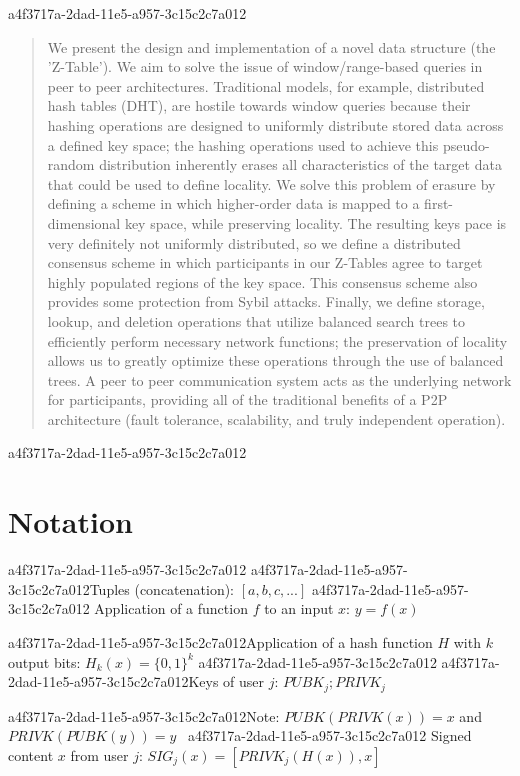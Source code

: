 \documentclass[12pt]{article}
\begin{document}
a4f3717a-2dad-11e5-a957-3c15c2c7a012
\maketitle

\begin{abstract}
We present the design and implementation of a novel data structure (the 'Z-Table'). We aim to solve the issue of window/range-based queries in peer to peer architectures. Traditional models, for example,  distributed hash tables (DHT), are hostile towards window queries because their hashing operations are designed to uniformly distribute stored data across a defined key space; the hashing operations used to achieve this pseudo-random distribution inherently erases all characteristics of the target data that could be used to define locality. We solve this problem of erasure by defining a scheme in which higher-order data is mapped to a first-dimensional key space, while preserving locality. The resulting keys pace is very definitely not uniformly distributed, so we define a distributed consensus scheme in which participants in our Z-Tables agree to target highly populated regions of the key space. This consensus scheme also provides some protection from Sybil attacks. Finally, we define storage, lookup, and deletion operations that utilize balanced search trees to efficiently perform necessary network functions; the preservation of locality allows us to greatly optimize these operations through the use of balanced trees. A peer to peer communication system acts as the underlying network for participants, providing all of the traditional benefits of a P2P architecture (fault tolerance, scalability, and truly independent operation).
\end{abstract}

a4f3717a-2dad-11e5-a957-3c15c2c7a012\section{Notation}
a4f3717a-2dad-11e5-a957-3c15c2c7a012
a4f3717a-2dad-11e5-a957-3c15c2c7a012Tuples (concatenation): $[a,b,c,...]$
a4f3717a-2dad-11e5-a957-3c15c2c7a012
Application of a function $f$ to an input $x$: $y=f(x)$

a4f3717a-2dad-11e5-a957-3c15c2c7a012Application of a hash function $H$ with $k$ output bits: $H_{k}(x) = \{0,1\}^k$
a4f3717a-2dad-11e5-a957-3c15c2c7a012
a4f3717a-2dad-11e5-a957-3c15c2c7a012Keys of user $j$: $ PUBK_j; PRIVK_j $

a4f3717a-2dad-11e5-a957-3c15c2c7a012Note: $PUBK(PRIVK(x)) = x$ and $PRIVK(PUBK(y)) = y$~
a4f3717a-2dad-11e5-a957-3c15c2c7a012
Signed content $x$ from user $j$: $SIG_j(x) = \left[ PRIVK_j( H(x) ), x \right]$
\end{document}
